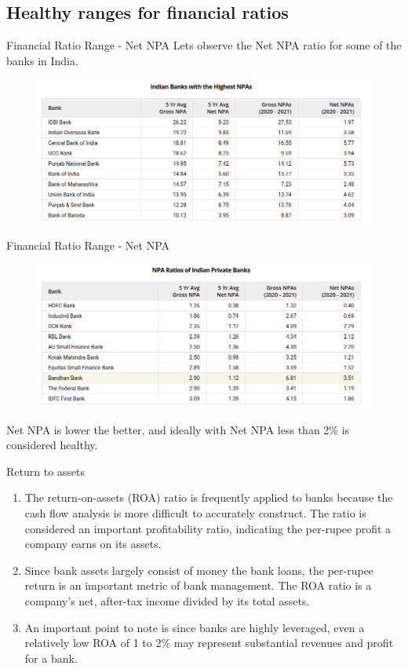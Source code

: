 \documentclass{beamer}
\begin{document}
\subsection{Healthy ranges for financial ratios}
\begin{frame}{Financial Ratio Range - Net NPA}
	Lets observe the Net NPA ratio for some of the banks in India.
	\begin{figure}
		\centering
		\includegraphics[width=0.7\linewidth]{Highest NPA.png}
		\label{fig:netnpa}
	\end{figure}
\end{frame}

\begin{frame}{Financial Ratio Range - Net NPA}
	\begin{figure}
		\centering
		\includegraphics[width=0.7\linewidth]{Private banks NPA.png}
		\label{fig:netnpapvt}
	\end{figure}
	Net NPA is lower the better, and ideally with Net NPA less than 2\% is considered healthy.
\end{frame}

\begin{frame}{Return to assets}
	\begin{enumerate}
		\item The return-on-assets (ROA) ratio is frequently applied to banks because the cash flow analysis is more difficult to accurately construct. The ratio is considered an important profitability ratio, indicating the per-rupee profit a company earns on its assets. 
		\item Since bank assets largely consist of money the bank loans, the per-rupee return is an important metric of bank management. The ROA ratio is a company's net, after-tax income divided by its total assets. 
		\item An important point to note is since banks are highly leveraged, even a relatively low ROA of 1 to 2\% may represent substantial revenues and profit for a bank.
	\end{enumerate}
\end{frame}
\end{document}
